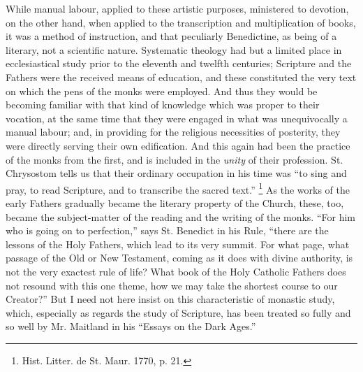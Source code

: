 While manual labour, applied to these artistic purposes, ministered
to devotion, on the other hand, when applied to the transcription and
multiplication of books, it was a method of instruction, and that
peculiarly Benedictine, as being of a literary, not a scientific
nature. Systematic theology had but a limited place in ecclesiastical
study prior to the eleventh and twelfth centuries; Scripture and the
Fathers were the received means of education, and these constituted
the very text on which the pens of the monks were employed. And thus
they would be becoming familiar with that kind of knowledge which was
proper to their vocation, at the same time that they were
engaged in what was unequivocally a manual labour; and, in providing
for the religious necessities of posterity, they were directly serving
their own edification. And this again had been the practice of the
monks from the first, and is included in the \emph{unity} of their
profession. St. Chrysostom tells us that their ordinary occupation in
his time was ``to sing and pray, to read Scripture, and to
transcribe the sacred text.'' \footnote{Hist. Litter.
de St. Maur. 1770, p. 21.} As the works of the early Fathers gradually became the
literary property of the Church, these, too, became the subject-matter
of the reading and the writing of the monks. ``For him who is
going on to perfection,'' says St. Benedict in his Rule,
``there are the lessons of the Holy Fathers, which lead to its
very summit. For what page, what passage of the Old or New Testament,
coming as it does with divine authority, is not the very exactest rule
of life? What book of the Holy Catholic Fathers does not resound with
this one theme, how we may take the shortest course to our
Creator?'' But I need not here insist on this characteristic of
monastic study, which, especially as regards the study of Scripture,
has been treated so fully and so well by Mr. Maitland in his
``Essays on the Dark Ages.''

